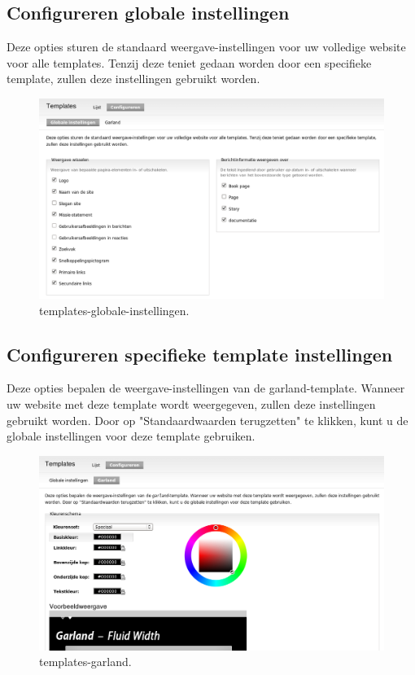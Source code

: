 \subsection{Configureren globale instellingen} 
 Deze opties sturen de standaard weergave-instellingen voor uw volledige website
 voor alle templates. Tenzij deze teniet gedaan worden door een specifieke template, zullen deze instellingen gebruikt worden.
 \begin{figure}[!h]
    \centering
   \includegraphics[scale=0.3,angle=0]{templates-globale-instellingen}
   \caption{templates-globale-instellingen.\label{white}}
 \end{figure}
 
\subsection{Configureren specifieke template instellingen} 
Deze opties bepalen de weergave-instellingen van de garland-template. Wanneer uw
website met deze template wordt weergegeven, zullen deze instellingen gebruikt worden. Door op "Standaardwaarden terugzetten" te klikken, 
kunt u de globale instellingen voor deze template gebruiken.
 \begin{figure}[!h]
    \centering
   \includegraphics[scale=0.3,angle=0]{templates-garland}
   \caption{templates-garland.\label{white}}
 \end{figure}
 
